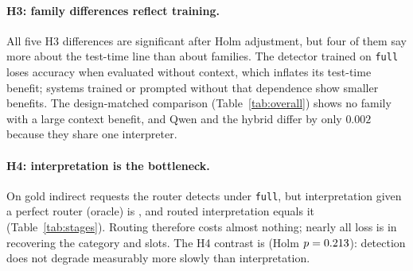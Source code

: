 \documentclass{article}
\begin{document}
\paragraph{H3: family differences reflect training.}
All five H3 differences are significant after Holm adjustment, but four of them say more about
the test-time line than about families. The detector trained on \texttt{full} loses accuracy
when evaluated without context, which inflates its test-time benefit; systems trained or prompted
without that dependence show smaller benefits. The design-matched comparison
(Table~\ref{tab:overall}) shows no family with a large context benefit, and Qwen and the hybrid
differ by only \(0.002\) because they share one interpreter.

\begin{table}[t]
  \caption{Detection, oracle and routed interpretation for the hybrid on identical gold indirect
  requests (matched line).}
  \label{tab:stages}
  \centering
  \small
  
\end{table}

\paragraph{H4: interpretation is the bottleneck.}
On gold indirect requests the router detects \DetectFull{} under \texttt{full}, but interpretation
given a perfect router (oracle) is \OracleFull, and routed interpretation equals it
(Table~\ref{tab:stages}). Routing therefore costs almost nothing; nearly all loss is in recovering
the category and slots. The H4 contrast is \HfourEst{} \HfourCI{} (Holm $p=0.213$): detection
does not degrade measurably more slowly than interpretation.

\begin{table}[t]
  \caption{Routed hybrid request interpretation by intent category (H5, exploratory; matched
  line). $n$ counts gold requests in the category.}
  \label{tab:intents}
  \centering
  \small
  
\end{table}
\end{document}
